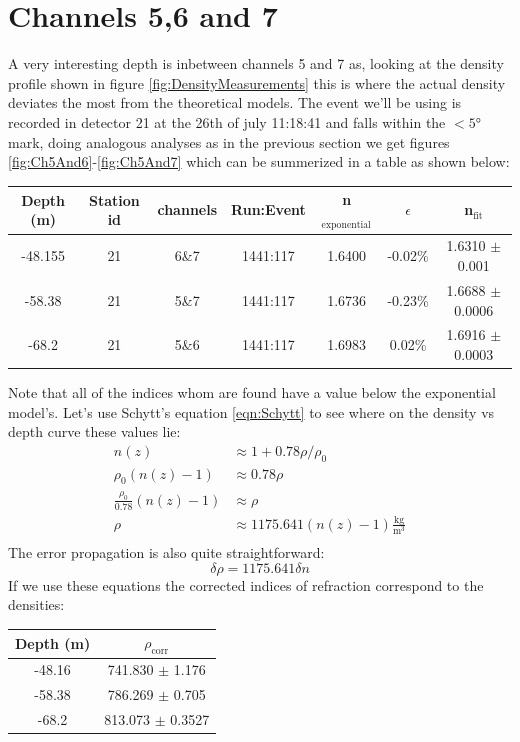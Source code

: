 \documentclass[11pt,a4paper,faculty=we,language=en,doctype=report]{cls/ugent-doc}
\begin{document}
\section{Channels 5,6 and 7}
A very interesting depth is inbetween channels 5 and 7 as, looking
at the density profile shown in figure \ref{fig:DensityMeasurements}
this is where the actual density deviates the most from the
theoretical models.  The event we'll be using is recorded in
detector 21 at the 26th of july 11:18:41 and falls within the $<5$°
mark, doing analogous analyses as in the previous section we get
figures \ref{fig:Ch5And6}-\ref{fig:Ch5And7} which can be summerized in a table as shown below:
	\label{fig:Ch5And7}
\begin{center}
\begin{tabular}{||c c c c c c c||}
 \hline
 Depth (m) & Station id & channels & Run:Event & n$_\text{exponential}$ & $\epsilon$ & n$_\text{fit}$\\ [0.5ex]
 \hline\hline
 -48.155 & 21 & 6\&7 & 1441:117 & 1.6400 & -0.02\% & 1.6310 $\pm$ 0.001 \\
 -58.38 & 21 & 5\&7 & 1441:117 & 1.6736 & -0.23\% & 1.6688 $\pm$ 0.0006 \\
 -68.2 & 21 & 5\&6 & 1441:117 & 1.6983 & 0.02\% & 1.6916 $\pm$ 0.0003 \\
 \hline
\end{tabular}
\end{center}
Note that all of the indices whom are found have a value below the
exponential model's.  Let's use Schytt's equation \ref{eqn:Schytt}
to see where on the density vs depth curve these values lie:
\begin{align}
	n(z) &\approx 1 + 0.78\rho/\rho_0\\
	\rho_0(n(z) - 1) &\approx 0.78\rho\\
	\frac{\rho_0}{0.78}(n(z) - 1) &\approx \rho\\
	\rho &\approx 1175.641(n(z) - 1)\frac{\text{kg}}{\text{m}^3}\\
\end{align}
The error propagation is also quite straightforward:
\begin{equation}
	\delta \rho = 1175.641\delta n
\end{equation}
If we use these equations the corrected indices of refraction
correspond to the densities:
\begin{center}
\begin{tabular}{||c c||}
 \hline
 Depth (m) & $\rho_\text{corr}$\\ [0.5ex]
 \hline\hline
 -48.16 & 741.830 $\pm$ 1.176 \\
 -58.38 & 786.269 $\pm$ 0.705 \\
 -68.2 & 813.073 $\pm$ 0.3527 \\
 \hline
\end{tabular}
\end{center}
\end{document}
